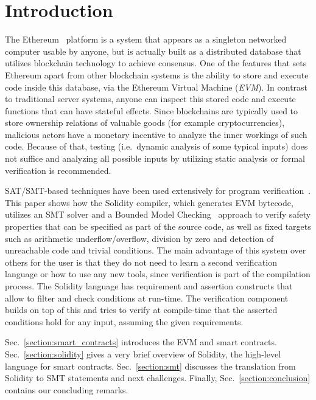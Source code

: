\section{Introduction}
The Ethereum~\cite{WhitePaper} platform is a system that appears as a
singleton networked computer usable by anyone, but is actually built as a
distributed database that utilizes blockchain technology to achieve consensus.
%
One of the features that sets Ethereum apart from other blockchain systems is
the ability to store and execute code inside this database, via the Ethereum
Virtual Machine (\emph{EVM}).
%
In contrast to traditional server systems, anyone can inspect this stored code
and execute functions that can have stateful effects.
%
Since blockchains are typically used to store ownership relations of valuable goods
(for example
cryptocurrencies),
malicious actors have a monetary incentive to analyze the inner
workings of such code. Because of that, testing (i.e.\  dynamic analysis of some
typical inputs) does not suffice and analyzing all possible inputs by utilizing
static analysis or formal verification is recommended.

SAT/SMT-based techniques have been used extensively for program 
verification~\cite{Biere99,Donaldson11,Komuravelli13,Beyer11,Kroening14,Alt17}.
%
This paper shows how the Solidity compiler, which generates EVM bytecode,
utilizes an SMT solver and a Bounded Model Checking~\cite{Biere99} approach to
verify safety properties that can be specified as part of the source code, as
well as fixed targets such as arithmetic underflow/overflow, division by zero and detection of
unreachable code and trivial conditions.
%
The main advantage of this system over others for the user is that they do not
need to learn a second verification language or how to use any new tools, since
verification is part of the compilation process.
%
The Solidity language has requirement and assertion constructs that allow to
filter and check conditions at run-time.  The verification component
builds on top of this and tries to
verify at compile-time that the asserted conditions hold for any input,
assuming the given requirements.

Sec.~\ref{section:smart_contracts} introduces the EVM and smart contracts.
Sec.~\ref{section:solidity} gives a very brief overview of Solidity,
the high-level language for smart
contracts. Sec.~\ref{section:smt} discusses the translation from Solidity to SMT
statements and next challenges. Finally, Sec.~\ref{section:conclusion}
contains our concluding remarks.

